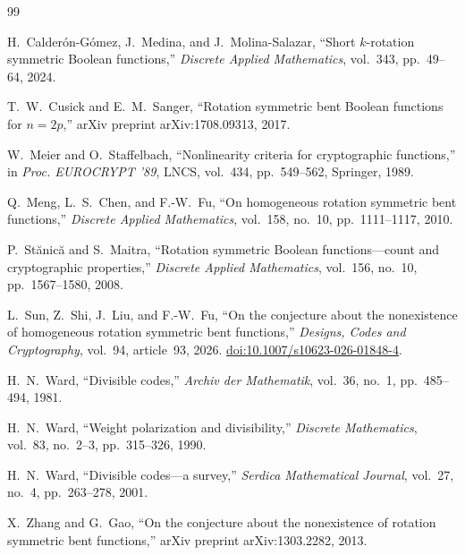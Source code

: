 \documentclass[11pt,a4paper]{article}
\theoremstyle{definition}
\begin{document}
\begin{thebibliography}{99}

H.~Calder\'on-G\'omez, J.~Medina, and J.~Molina-Salazar,
``Short $k$-rotation symmetric Boolean functions,''
\emph{Discrete Applied Mathematics}, vol.~343, pp.~49--64, 2024.

T.~W.~Cusick and E.~M.~Sanger,
``Rotation symmetric bent Boolean functions for $n = 2p$,''
arXiv preprint arXiv:1708.09313, 2017.

W.~Meier and O.~Staffelbach,
``Nonlinearity criteria for cryptographic functions,''
in \emph{Proc. EUROCRYPT '89}, LNCS, vol.~434, pp.~549--562, Springer, 1989.

Q.~Meng, L.~S.~Chen, and F.-W.~Fu,
``On homogeneous rotation symmetric bent functions,''
\emph{Discrete Applied Mathematics}, vol.~158, no.~10, pp.~1111--1117, 2010.

P.~St\u{a}nic\u{a} and S.~Maitra,
``Rotation symmetric Boolean functions---count and cryptographic properties,''
\emph{Discrete Applied Mathematics}, vol.~156, no.~10, pp.~1567--1580, 2008.

L.~Sun, Z.~Shi, J.~Liu, and F.-W.~Fu,
``On the conjecture about the nonexistence of homogeneous rotation symmetric bent functions,''
\emph{Designs, Codes and Cryptography}, vol.~94, article~93, 2026.
\href{https://doi.org/10.1007/s10623-026-01848-4}{doi:10.1007/s10623-026-01848-4}.

H.~N.~Ward,
``Divisible codes,''
\emph{Archiv der Mathematik}, vol.~36, no.~1, pp.~485--494, 1981.

H.~N.~Ward,
``Weight polarization and divisibility,''
\emph{Discrete Mathematics}, vol.~83, no.~2--3, pp.~315--326, 1990.

H.~N.~Ward,
``Divisible codes---a survey,''
\emph{Serdica Mathematical Journal}, vol.~27, no.~4, pp.~263--278, 2001.

X.~Zhang and G.~Gao,
``On the conjecture about the nonexistence of rotation symmetric bent functions,''
arXiv preprint arXiv:1303.2282, 2013.

\end{thebibliography}
\end{document}
